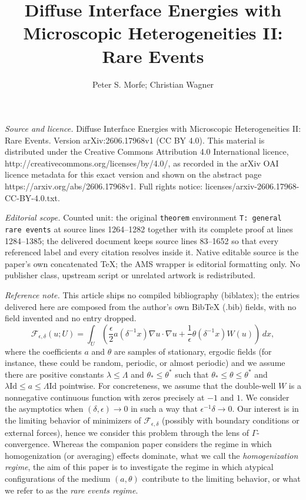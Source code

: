 \documentclass[10pt,a4paper]{amsart}
\begin{document}
\title[Diffuse Interface Energies with Microscopic Heterogeneities ]{Diffuse Interface Energies with Microscopic Heterogeneities II: Rare Events}
\author{Peter S. Morfe; Christian Wagner}
\date{}
\maketitle
\noindent\emph{Source and licence.} Diffuse Interface Energies with Microscopic Heterogeneities II: Rare Events. Version arXiv:2606.17968v1 (CC BY 4.0). This material is distributed under the Creative Commons Attribution 4.0 International licence, http://creativecommons.org/licenses/by/4.0/, as recorded in the arXiv OAI licence metadata for this exact version and shown on the abstract page https://arxiv.org/abs/2606.17968v1. Full rights notice: licenses/arxiv-2606.17968-CC-BY-4.0.txt.\par\smallskip
\noindent\textit{Editorial scope.} Counted unit: the original \texttt{theorem} environment \texttt{T: general rare events} at source lines 1264--1282 together with its complete proof at lines 1284--1385; the delivered document keeps source lines 83--1652 so that every referenced label and every citation resolves inside it. Native editable source is the paper's own concatenated TeX; the AMS wrapper is editorial formatting only. No publisher class, upstream script or unrelated artwork is redistributed.
\par\smallskip\noindent\textit{Reference note.} This article ships no compiled bibliography (biblatex); the entries delivered here are composed from the author's own BibTeX (.bib) fields, with no field invented and no entry dropped.
	\begin{equation} \label{E: our energy}
		\mathscr{F}_{\epsilon,\delta}(u; U) = \int_{U} \left( \frac{\epsilon}{2} a(\delta^{-1} x) \nabla u \cdot \nabla u + \frac{1}{\epsilon} \theta(\delta^{-1}x) W(u) \right) \, dx,
	\end{equation}
where the coefficients $a$ and $\theta$ are samples of stationary, ergodic fields (for instance, these could be random, periodic, or almost periodic) and we assume there are positive constants $\lambda \leq \Lambda$ and $\theta_{*} \leq \theta^{*}$ such that $\theta_{*} \leq \theta \leq \theta^{*}$ and $\lambda \text{Id} \leq a \leq \Lambda \text{Id}$ pointwise.  For concreteness, we assume that the double-well $W$ is a nonnegative continuous function with zeros precisely at $-1$ and $1$.  We consider the asymptotics when $(\delta,\epsilon ) \to 0$ in such a way that $\epsilon^{-1} \delta \to 0$.  Our interest is in the limiting behavior of minimizers of $\mathscr{F}_{\epsilon,\delta}$ (possibly with boundary conditions or external forces), hence we consider this problem through the lens of $\Gamma$-convergence.  Whereas the companion paper \cite{part1} considers the regime in which homogenization (or averaging) effects dominate, what we call the \emph{homogenization regime}, the aim of this paper is to investigate the regime in which atypical configurations of the medium $(a,\theta)$ contribute to the limiting behavior, or what we refer to as the \emph{rare events regime}.
\end{document}
